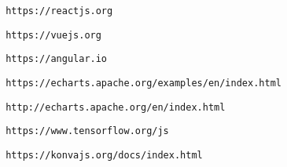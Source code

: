 \begin{thebibliography}{99}
 \begin{verbatim} https://reactjs.org 
\end{verbatim}

 \begin{verbatim} https://vuejs.org 
\end{verbatim}

 \begin{verbatim} https://angular.io 
\end{verbatim}

 \begin{verbatim} https://echarts.apache.org/examples/en/index.html 
\end{verbatim}

 \begin{verbatim} http://echarts.apache.org/en/index.html 
\end{verbatim}

 \begin{verbatim} https://www.tensorflow.org/js 
\end{verbatim}

 \begin{verbatim} https://konvajs.org/docs/index.html
\end{verbatim}

\end{thebibliography}

